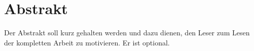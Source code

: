 \chapter*{Abstrakt}
Der Abstrakt soll kurz gehalten werden und dazu dienen, den Leser zum Lesen der kompletten Arbeit zu motivieren. Er ist optional.
\vfill
